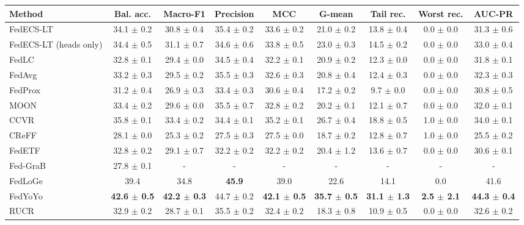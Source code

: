 \begin{tabular}{lcccccccc}
\toprule
Method & Bal. acc. & Macro-F1 & Precision & MCC & G-mean & Tail rec. & Worst rec. & AUC-PR\\
\midrule
FedECS-LT & 34.1 $\pm$ 0.2 & 30.8 $\pm$ 0.4 & 35.4 $\pm$ 0.2 & 33.6 $\pm$ 0.2 & 21.0 $\pm$ 0.2 & 13.8 $\pm$ 0.4 & 0.0 $\pm$ 0.0 & 31.3 $\pm$ 0.6\\
FedECS-LT (heads only) & 34.4 $\pm$ 0.5 & 31.1 $\pm$ 0.7 & 34.6 $\pm$ 0.6 & 33.8 $\pm$ 0.5 & 23.0 $\pm$ 0.3 & 14.5 $\pm$ 0.2 & 0.0 $\pm$ 0.0 & 33.0 $\pm$ 0.4\\
FedLC & 32.8 $\pm$ 0.1 & 29.4 $\pm$ 0.0 & 34.5 $\pm$ 0.4 & 32.2 $\pm$ 0.1 & 20.9 $\pm$ 0.2 & 12.3 $\pm$ 0.0 & 0.0 $\pm$ 0.0 & 31.8 $\pm$ 0.1\\
FedAvg & 33.2 $\pm$ 0.3 & 29.5 $\pm$ 0.2 & 35.5 $\pm$ 0.3 & 32.6 $\pm$ 0.3 & 20.8 $\pm$ 0.4 & 12.4 $\pm$ 0.3 & 0.0 $\pm$ 0.0 & 32.3 $\pm$ 0.3\\
FedProx & 31.2 $\pm$ 0.4 & 26.9 $\pm$ 0.3 & 33.4 $\pm$ 0.3 & 30.6 $\pm$ 0.4 & 17.2 $\pm$ 0.2 & 9.7 $\pm$ 0.0 & 0.0 $\pm$ 0.0 & 30.8 $\pm$ 0.5\\
MOON & 33.4 $\pm$ 0.2 & 29.6 $\pm$ 0.0 & 35.5 $\pm$ 0.7 & 32.8 $\pm$ 0.2 & 20.2 $\pm$ 0.1 & 12.1 $\pm$ 0.7 & 0.0 $\pm$ 0.0 & 32.0 $\pm$ 0.1\\
CCVR & 35.8 $\pm$ 0.1 & 33.4 $\pm$ 0.2 & 34.4 $\pm$ 0.1 & 35.2 $\pm$ 0.1 & 26.7 $\pm$ 0.4 & 18.8 $\pm$ 0.5 & 1.0 $\pm$ 0.0 & 34.0 $\pm$ 0.1\\
CReFF & 28.1 $\pm$ 0.0 & 25.3 $\pm$ 0.2 & 27.5 $\pm$ 0.3 & 27.5 $\pm$ 0.0 & 18.7 $\pm$ 0.2 & 12.8 $\pm$ 0.7 & 1.0 $\pm$ 0.0 & 25.5 $\pm$ 0.2\\
FedETF & 32.8 $\pm$ 0.2 & 29.1 $\pm$ 0.7 & 32.2 $\pm$ 0.2 & 32.2 $\pm$ 0.2 & 20.4 $\pm$ 1.2 & 13.6 $\pm$ 0.7 & 0.0 $\pm$ 0.0 & 30.6 $\pm$ 0.1\\
Fed-GraB & 27.8 $\pm$ 0.1 & - & - & - & - & - & - & -\\
FedLoGe & 39.4 & 34.8 & \textbf{45.9} & 39.0 & 22.6 & 14.1 & 0.0 & 41.6\\
FedYoYo & \textbf{42.6 $\pm$ 0.5} & \textbf{42.2 $\pm$ 0.3} & 44.7 $\pm$ 0.2 & \textbf{42.1 $\pm$ 0.5} & \textbf{35.7 $\pm$ 0.5} & \textbf{31.1 $\pm$ 1.3} & \textbf{2.5 $\pm$ 2.1} & \textbf{44.3 $\pm$ 0.4}\\
RUCR & 32.9 $\pm$ 0.2 & 28.7 $\pm$ 0.1 & 35.5 $\pm$ 0.2 & 32.4 $\pm$ 0.2 & 18.3 $\pm$ 0.8 & 10.9 $\pm$ 0.5 & 0.0 $\pm$ 0.0 & 32.6 $\pm$ 0.2\\
\bottomrule
\end{tabular}
